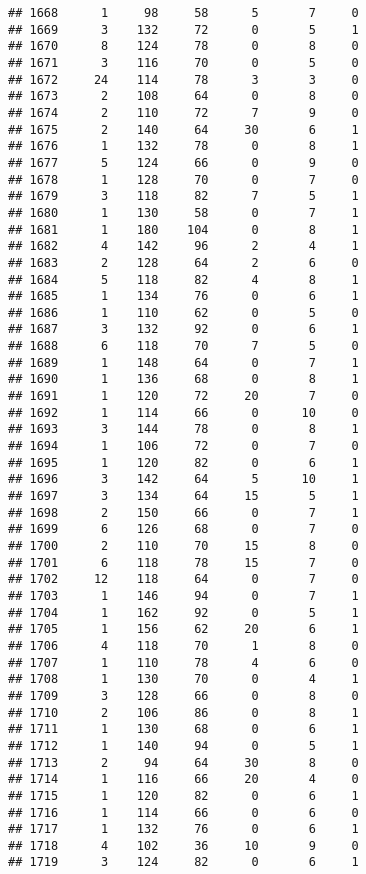\documentclass[
]{article}
\begin{document}
\begin{verbatim}
## 1668      1     98     58      5       7     0
## 1669      3    132     72      0       5     1
## 1670      8    124     78      0       8     0
## 1671      3    116     70      0       5     0
## 1672     24    114     78      3       3     0
## 1673      2    108     64      0       8     0
## 1674      2    110     72      7       9     0
## 1675      2    140     64     30       6     1
## 1676      1    132     78      0       8     1
## 1677      5    124     66      0       9     0
## 1678      1    128     70      0       7     0
## 1679      3    118     82      7       5     1
## 1680      1    130     58      0       7     1
## 1681      1    180    104      0       8     1
## 1682      4    142     96      2       4     1
## 1683      2    128     64      2       6     0
## 1684      5    118     82      4       8     1
## 1685      1    134     76      0       6     1
## 1686      1    110     62      0       5     0
## 1687      3    132     92      0       6     1
## 1688      6    118     70      7       5     0
## 1689      1    148     64      0       7     1
## 1690      1    136     68      0       8     1
## 1691      1    120     72     20       7     0
## 1692      1    114     66      0      10     0
## 1693      3    144     78      0       8     1
## 1694      1    106     72      0       7     0
## 1695      1    120     82      0       6     1
## 1696      3    142     64      5      10     1
## 1697      3    134     64     15       5     1
## 1698      2    150     66      0       7     1
## 1699      6    126     68      0       7     0
## 1700      2    110     70     15       8     0
## 1701      6    118     78     15       7     0
## 1702     12    118     64      0       7     0
## 1703      1    146     94      0       7     1
## 1704      1    162     92      0       5     1
## 1705      1    156     62     20       6     1
## 1706      4    118     70      1       8     0
## 1707      1    110     78      4       6     0
## 1708      1    130     70      0       4     1
## 1709      3    128     66      0       8     0
## 1710      2    106     86      0       8     1
## 1711      1    130     68      0       6     1
## 1712      1    140     94      0       5     1
## 1713      2     94     64     30       8     0
## 1714      1    116     66     20       4     0
## 1715      1    120     82      0       6     1
## 1716      1    114     66      0       6     0
## 1717      1    132     76      0       6     1
## 1718      4    102     36     10       9     0
## 1719      3    124     82      0       6     1

\end{verbatim}
\end{document}
